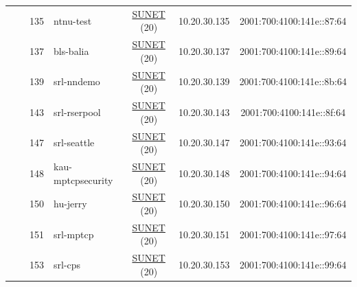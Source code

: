 \begin{small}
\begin{center}
\begin{longtable}{|c|c|c|c|c|c|c|c|}
  &  & \tiny{135} & \multicolumn{1}{|l|}{\tiny{ntnu-test}} & \multicolumn{2}{|c|}{\tiny{\href{http://www.sunet.se}{SUNET} (20)}} & \tiny{10.20.30.135} & \tiny{2001:700:4100:141e::87:64} \\* \cline{3-3}\cline{4-4}\cline{5-5}\cline{6-6}\cline{7-7}\cline{8-8}
  &  & \tiny{137} & \multicolumn{1}{|l|}{\tiny{bls-balia}} & \multicolumn{2}{|c|}{\tiny{\href{http://www.sunet.se}{SUNET} (20)}} & \tiny{10.20.30.137} & \tiny{2001:700:4100:141e::89:64} \\* \cline{3-3}\cline{4-4}\cline{5-5}\cline{6-6}\cline{7-7}\cline{8-8}
  &  & \tiny{139} & \multicolumn{1}{|l|}{\tiny{srl-nndemo}} & \multicolumn{2}{|c|}{\tiny{\href{http://www.sunet.se}{SUNET} (20)}} & \tiny{10.20.30.139} & \tiny{2001:700:4100:141e::8b:64} \\* \cline{3-3}\cline{4-4}\cline{5-5}\cline{6-6}\cline{7-7}\cline{8-8}
  &  & \tiny{143} & \multicolumn{1}{|l|}{\tiny{srl-rserpool}} & \multicolumn{2}{|c|}{\tiny{\href{http://www.sunet.se}{SUNET} (20)}} & \tiny{10.20.30.143} & \tiny{2001:700:4100:141e::8f:64} \\* \cline{3-3}\cline{4-4}\cline{5-5}\cline{6-6}\cline{7-7}\cline{8-8}
  &  & \tiny{147} & \multicolumn{1}{|l|}{\tiny{srl-seattle}} & \multicolumn{2}{|c|}{\tiny{\href{http://www.sunet.se}{SUNET} (20)}} & \tiny{10.20.30.147} & \tiny{2001:700:4100:141e::93:64} \\* \cline{3-3}\cline{4-4}\cline{5-5}\cline{6-6}\cline{7-7}\cline{8-8}
  &  & \tiny{148} & \multicolumn{1}{|l|}{\tiny{kau-mptcpsecurity}} & \multicolumn{2}{|c|}{\tiny{\href{http://www.sunet.se}{SUNET} (20)}} & \tiny{10.20.30.148} & \tiny{2001:700:4100:141e::94:64} \\* \cline{3-3}\cline{4-4}\cline{5-5}\cline{6-6}\cline{7-7}\cline{8-8}
  &  & \tiny{150} & \multicolumn{1}{|l|}{\tiny{hu-jerry}} & \multicolumn{2}{|c|}{\tiny{\href{http://www.sunet.se}{SUNET} (20)}} & \tiny{10.20.30.150} & \tiny{2001:700:4100:141e::96:64} \\* \cline{3-3}\cline{4-4}\cline{5-5}\cline{6-6}\cline{7-7}\cline{8-8}
  &  & \tiny{151} & \multicolumn{1}{|l|}{\tiny{srl-mptcp}} & \multicolumn{2}{|c|}{\tiny{\href{http://www.sunet.se}{SUNET} (20)}} & \tiny{10.20.30.151} & \tiny{2001:700:4100:141e::97:64} \\* \cline{3-3}\cline{4-4}\cline{5-5}\cline{6-6}\cline{7-7}\cline{8-8}
  &  & \tiny{153} & \multicolumn{1}{|l|}{\tiny{srl-cps}} & \multicolumn{2}{|c|}{\tiny{\href{http://www.sunet.se}{SUNET} (20)}} & \tiny{10.20.30.153} & \tiny{2001:700:4100:141e::99:64} \\ \hline

\end{longtable}
\end{center}
\end{small}
